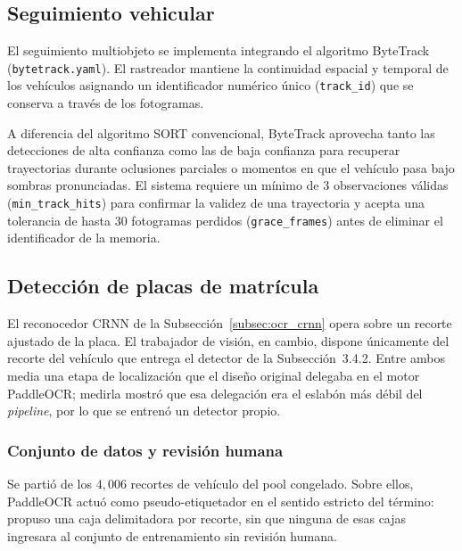 \subsection{Seguimiento vehicular}

El seguimiento multiobjeto se implementa integrando el algoritmo ByteTrack
(\texttt{bytetrack.yaml}). El rastreador mantiene la continuidad espacial y
temporal de los vehículos asignando un identificador numérico único (\texttt{track\_id})
que se conserva a través de los fotogramas.

A diferencia del algoritmo SORT convencional, ByteTrack aprovecha tanto las
detecciones de alta confianza como las de baja confianza para recuperar trayectorias
durante oclusiones parciales o momentos en que el vehículo pasa bajo sombras
pronunciadas. El sistema requiere un mínimo de $3$ observaciones válidas
(\texttt{min\_track\_hits}) para confirmar la validez de una trayectoria y acepta una
tolerancia de hasta $30$ fotogramas perdidos (\texttt{grace\_frames}) antes de
eliminar el identificador de la memoria.

\subsection{Detección de placas de matrícula}
\label{subsec:deteccion_placas}

El reconocedor CRNN de la Subsección~\ref{subsec:ocr_crnn} opera sobre un recorte
ajustado de la placa. El trabajador de visión, en cambio, dispone únicamente del
recorte del vehículo que entrega el detector de la Subsección~3.4.2. Entre ambos
media una etapa de localización que el diseño original delegaba en el motor
PaddleOCR; medirla mostró que esa delegación era el eslabón más débil del
\emph{pipeline}, por lo que se entrenó un detector propio.

\subsubsection{Conjunto de datos y revisión humana}

Se partió de los $4{,}006$ recortes de vehículo del pool congelado. Sobre ellos,
PaddleOCR actuó como pseudo-etiquetador en el sentido estricto del
término: propuso una caja delimitadora por recorte, sin que ninguna de esas cajas
ingresara al conjunto de entrenamiento sin revisión humana.

